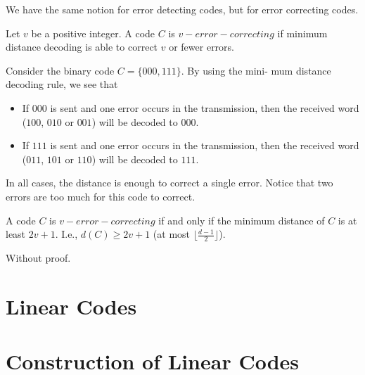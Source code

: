 We have the same notion for error detecting codes, but for error correcting codes.
\begin{definition}
Let $v$ be a positive integer. A code $C$ is $v-error-correcting$
if minimum distance decoding is able to correct $v$ or fewer errors.
\end{definition}

\begin{example}
    Consider the binary code $C = \{000, 111\}$. By using the mini-
mum distance decoding rule, we see that
\begin{itemize}
    \item If $000$ is sent and one error occurs in the transmission, then the received word
    ($100$, $010$ or $001$) will be decoded to $000$.
    \item If $111$ is sent and one error occurs in the transmission, then the received word
    ($011$, $101$ or $110$) will be decoded to $111$.
\end{itemize}

In all cases, the distance is enough to correct a single error. Notice that two errors 
are too much for this code to correct.
\end{example}

\begin{theorem}
    A code $C$ is $v-error-correcting$ if and only if the minimum distance of $C$ is at least $2v+1$.
    I.e., $d(C)\ge 2v+1$ (at most $\lfloor \frac{d-1}{2}\rfloor$).
\end{theorem}

Without proof.


\section{Linear Codes}


\section{Construction of Linear Codes}

